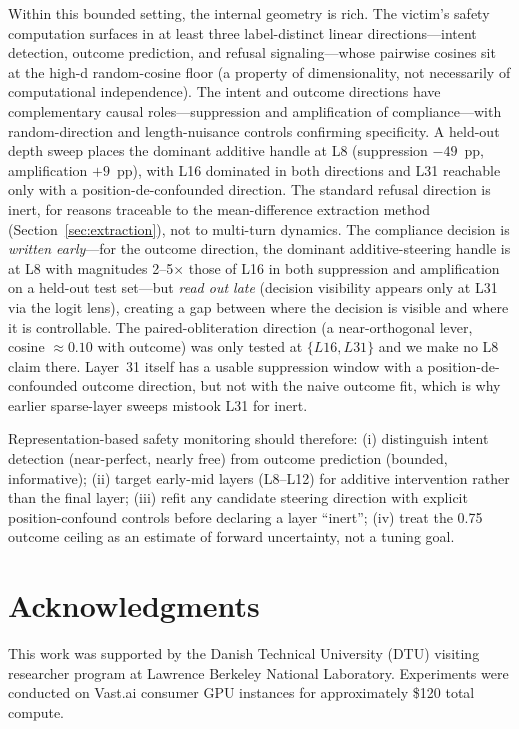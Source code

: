 \documentclass[11pt]{article}
\begin{document}
Within this bounded setting, the internal geometry is rich.
The victim's safety computation surfaces in at least three label-distinct linear directions---intent detection, outcome prediction, and refusal signaling---whose pairwise cosines sit at the high-d random-cosine floor (a property of dimensionality, not necessarily of computational independence).
The intent and outcome directions have complementary causal roles---suppression and amplification of compliance---with random-direction and length-nuisance controls confirming specificity. A held-out depth sweep places the dominant additive handle at L8 (suppression $-49$~pp, amplification $+9$~pp), with L16 dominated in both directions and L31 reachable only with a position-de-confounded direction.
The standard refusal direction is inert, for reasons traceable to the mean-difference extraction method (Section~\ref{sec:extraction}), not to multi-turn dynamics.
The compliance decision is \emph{written early}---for the outcome direction, the dominant additive-steering handle is at L8 with magnitudes 2--5$\times$ those of L16 in both suppression and amplification on a held-out test set---but \emph{read out late} (decision visibility appears only at L31 via the logit lens), creating a gap between where the decision is visible and where it is controllable. The paired-obliteration direction (a near-orthogonal lever, cosine $\approx 0.10$ with outcome) was only tested at $\{L16, L31\}$ and we make no L8 claim there. Layer~31 itself has a usable suppression window with a position-de-confounded outcome direction, but not with the naive outcome fit, which is why earlier sparse-layer sweeps mistook L31 for inert.

Representation-based safety monitoring should therefore: (i) distinguish intent detection (near-perfect, nearly free) from outcome prediction (bounded, informative); (ii) target early-mid layers (L8--L12) for additive intervention rather than the final layer; (iii) refit any candidate steering direction with explicit position-confound controls before declaring a layer ``inert''; (iv) treat the 0.75 outcome ceiling as an estimate of forward uncertainty, not a tuning goal.

\section*{Acknowledgments}
This work was supported by the Danish Technical University (DTU) visiting researcher program at Lawrence Berkeley National Laboratory.
Experiments were conducted on Vast.ai consumer GPU instances for approximately \$120 total compute.



\end{document}
